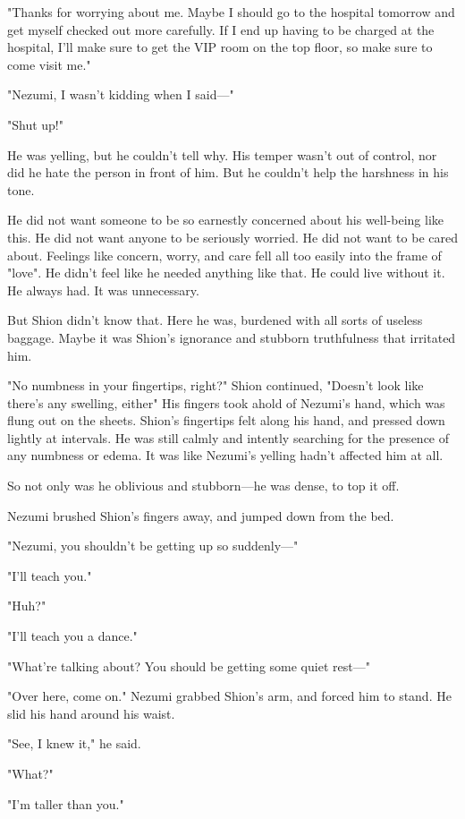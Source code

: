 "Thanks for worrying about me. Maybe I should go to the hospital
tomorrow and get myself checked out more carefully. If I end up having
to be charged at the hospital, I'll make sure to get the VIP room on the
top floor, so make sure to come visit me."

"Nezumi, I wasn't kidding when I said---"

"Shut up!"

He was yelling, but he couldn't tell why. His temper wasn't out of
control, nor did he hate the person in front of him. But he couldn't
help the harshness in his tone.

He did not want someone to be so earnestly concerned about his
well-being like this. He did not want anyone to be seriously worried. He
did not want to be cared about. Feelings like concern, worry, and care
fell all too easily into the frame of "love". He didn't feel like he
needed anything like that. He could live without it. He always had. It
was unnecessary.

But Shion didn't know that. Here he was, burdened with all sorts of
useless baggage. Maybe it was Shion's ignorance and stubborn
truthfulness that irritated him.

"No numbness in your fingertips, right?" Shion continued, "Doesn't look
like there's any swelling, either\el " His fingers took ahold of Nezumi's
hand, which was flung out on the sheets. Shion's fingertips felt along
his hand, and pressed down lightly at intervals. He was still calmly and
intently searching for the presence of any numbness or edema. It was
like Nezumi's yelling hadn't affected him at all.

So not only was he oblivious and stubborn---he was dense, to top it off.

Nezumi brushed Shion's fingers away, and jumped down from the bed.

"Nezumi, you shouldn't be getting up so suddenly---"

"I'll teach you."

"Huh?"

"I'll teach you a dance."

"What're talking about? You should be getting some quiet rest---"

"Over here, come on." Nezumi grabbed Shion's arm, and forced him to
stand. He slid his hand around his waist.

"See, I knew it," he said.

"What?"

"I'm taller than you."

